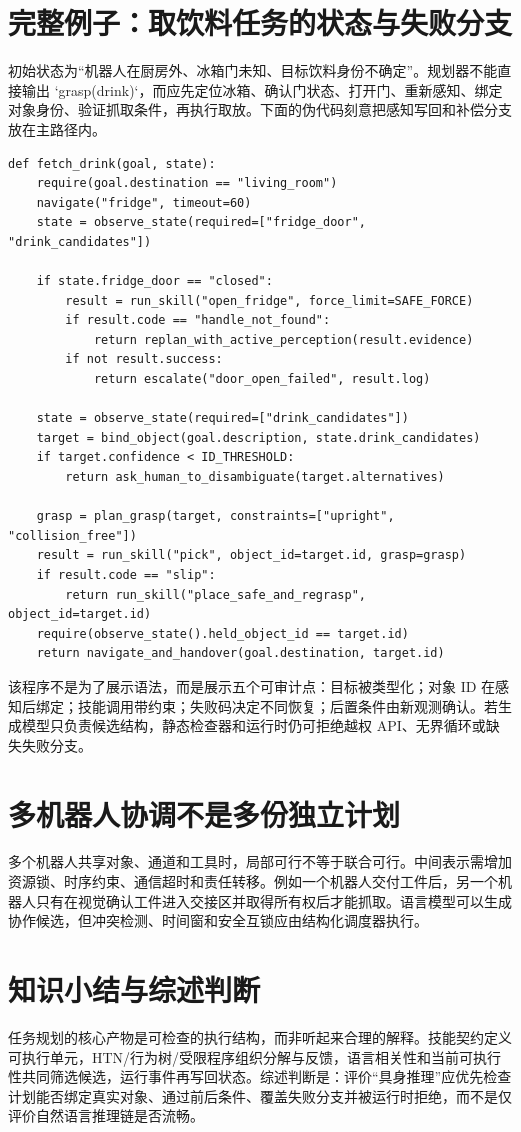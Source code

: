 \section{完整例子：取饮料任务的状态与失败分支}

初始状态为“机器人在厨房外、冰箱门未知、目标饮料身份不确定”。规划器不能直接输出 `grasp(drink)`，而应先定位冰箱、确认门状态、打开门、重新感知、绑定对象身份、验证抓取条件，再执行取放。下面的伪代码刻意把感知写回和补偿分支放在主路径内。

\begin{lstlisting}[caption={受限任务程序：显式前置条件、写回与失败分支}]
def fetch_drink(goal, state):
    require(goal.destination == "living_room")
    navigate("fridge", timeout=60)
    state = observe_state(required=["fridge_door", "drink_candidates"])

    if state.fridge_door == "closed":
        result = run_skill("open_fridge", force_limit=SAFE_FORCE)
        if result.code == "handle_not_found":
            return replan_with_active_perception(result.evidence)
        if not result.success:
            return escalate("door_open_failed", result.log)

    state = observe_state(required=["drink_candidates"])
    target = bind_object(goal.description, state.drink_candidates)
    if target.confidence < ID_THRESHOLD:
        return ask_human_to_disambiguate(target.alternatives)

    grasp = plan_grasp(target, constraints=["upright", "collision_free"])
    result = run_skill("pick", object_id=target.id, grasp=grasp)
    if result.code == "slip":
        return run_skill("place_safe_and_regrasp", object_id=target.id)
    require(observe_state().held_object_id == target.id)
    return navigate_and_handover(goal.destination, target.id)
\end{lstlisting}

该程序不是为了展示语法，而是展示五个可审计点：目标被类型化；对象 ID 在感知后绑定；技能调用带约束；失败码决定不同恢复；后置条件由新观测确认。若生成模型只负责候选结构，静态检查器和运行时仍可拒绝越权 API、无界循环或缺失失败分支。

\section{多机器人协调不是多份独立计划}

多个机器人共享对象、通道和工具时，局部可行不等于联合可行。中间表示需增加资源锁、时序约束、通信超时和责任转移。例如一个机器人交付工件后，另一个机器人只有在视觉确认工件进入交接区并取得所有权后才能抓取。语言模型可以生成协作候选，但冲突检测、时间窗和安全互锁应由结构化调度器执行。

\section{知识小结与综述判断}

任务规划的核心产物是可检查的执行结构，而非听起来合理的解释。技能契约定义可执行单元，HTN/行为树/受限程序组织分解与反馈，语言相关性和当前可执行性共同筛选候选，运行事件再写回状态。综述判断是：评价“具身推理”应优先检查计划能否绑定真实对象、通过前后条件、覆盖失败分支并被运行时拒绝，而不是仅评价自然语言推理链是否流畅。
